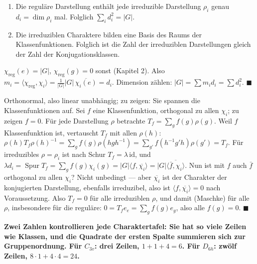 \begin{merksatz}
\begin{enumerate}[label=(\alph*), leftmargin=1.6em]
\item Die reguläre Darstellung enthält jede irreduzible Darstellung $\rho_i$ genau $d_i = \dim\rho_i$ mal. Folglich $\sum_id_i^{2} = |G|$.
\item Die irreduziblen Charaktere bilden eine Basis des Raums der Klassenfunktionen. Folglich ist die Zahl der irreduziblen Darstellungen gleich der Zahl der Konjugationsklassen.
\end{enumerate}

$\chi_{\mathrm{reg}}(e) = |G|$, $\chi_{\mathrm{reg}}(g) = 0$ sonst (Kapitel 2). Also $m_i = \langle\chi_{\mathrm{reg}}, \chi_i\rangle = \frac1{|G|}|G|\,\overline{\chi_i(e)} = d_i$. Dimension zählen: $|G| = \sum m_id_i = \sum d_i^{2}$. $\blacksquare$

Orthonormal, also linear unabhängig; zu zeigen: Sie spannen die Klassenfunktionen auf. Sei $f$ eine Klassenfunktion, orthogonal zu allen $\chi_i$; zu zeigen $f = 0$. Für jede Darstellung $\rho$ betrachte $T_f = \sum_gf(g)\rho(g)$. Weil $f$ Klassenfunktion ist, vertauscht $T_f$ mit allen $\rho(h)$: $\rho(h)T_f\rho(h)^{-1} = \sum_gf(g)\rho(hgh^{-1}) = \sum_{g'}f(h^{-1}g'h)\rho(g') = T_f$. Für irreduzibles $\rho = \rho_i$ ist nach Schur $T_f = \lambda\,\mathrm{id}$, und $\lambda d_i = \operatorname{Spur}T_f = \sum_gf(g)\chi_i(g) = |G|\langle f, \overline{\chi_i}\rangle = |G|\overline{\langle\bar f, \chi_i\rangle}$. Nun ist mit $f$ auch $\bar f$ orthogonal zu allen $\chi_i$? Nicht unbedingt --- aber $\overline{\chi_i}$ ist der Charakter der konjugierten Darstellung, ebenfalls irreduzibel, also ist $\langle f, \overline{\chi_i}\rangle = 0$ nach Voraussetzung. Also $T_f = 0$ für alle irreduziblen $\rho$, und damit (Maschke) für alle $\rho$, insbesondere für die reguläre: $0 = T_fe_e = \sum_gf(g)e_g$, also alle $f(g) = 0$. $\blacksquare$

\begin{center}
\begin{minipage}{0.9\textwidth}
\textbf{Zwei Zahlen kontrollieren jede Charaktertafel: Sie hat so viele Zeilen wie Klassen, und die Quadrate der ersten Spalte summieren sich zur Gruppenordnung. Für $C_{3v}$: drei Zeilen, $1 + 1 + 4 = 6$. Für $D_{6h}$: zwölf Zeilen, $8\cdot1 + 4\cdot4 = 24$.}
\end{minipage}
\end{center}


\end{merksatz}

